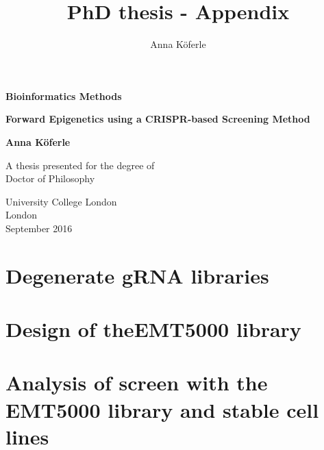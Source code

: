 \documentclass[12pt]{report}
\begin{document}
\title{PhD thesis - Appendix}
\author{Anna Köferle}

\begin{titlepage}
    \begin{center}
        \vspace*{3cm}
        
		\begin{Huge}
		\textbf{Bioinformatics Methods}
		\end{Huge}   
		 \vspace{3cm}      
		 
		 
		\begin{Huge}
		\textbf{Forward Epigenetics using a CRISPR-based Screening Method}
		\end{Huge}        
		
        \vspace{3.cm}      
        
        {\Large \textbf{Anna Köferle}}
        
        \vfill
        
        A thesis presented for the degree of\\
        Doctor of Philosophy
        
        \vspace{1.5cm}
        
        
        University College London\\
        London\\
        September 2016\\
        
        
    \end{center}
\end{titlepage}

\onehalfspacing

\tableofcontents


\chapter{Degenerate gRNA libraries}
\label{ch:degenerate-libraries}


\chapter{Design of theEMT5000 library}
\label{ch:EMT5000_library}


\chapter{Analysis of screen with the EMT5000 library and stable cell lines}
\label{ch:EMT5000-screen}





\end{document}
